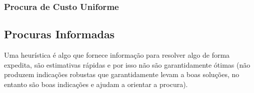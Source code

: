 \subsubsection{Procura de Custo Uniforme}\label{subsubsec:procura-custo-uniforme}




\subsection{Procuras Informadas}\label{subsec:procuras-informadas}

Uma heurística é algo que fornece informação para resolver algo de forma expedita, são estimativas rápidas e por isso não são garantidamente ótimas (não produzem indicações robustas que garantidamente levam a boas soluções, no entanto são boas indicações e ajudam a orientar a procura).
